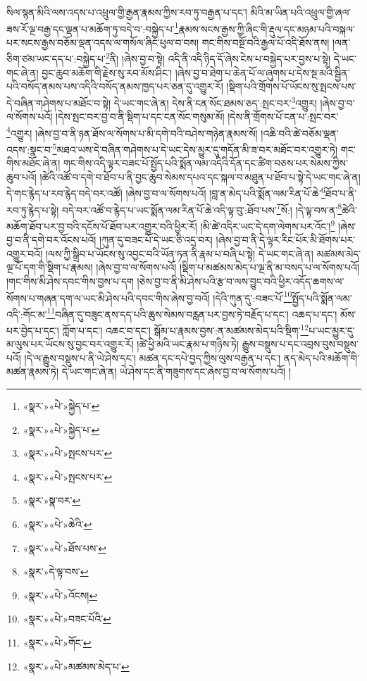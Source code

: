 སིལ་སྙན་མིའི་ལས་འདས་པ་འཕྲུལ་གྱི་རྒྱན་རྣམས་ཀྱིས་རབ་ཏུ་བརྒྱན་པ་དང་། མིའི་མ་ཡིན་པའི་འཕྲུལ་གྱི་ཞལ་ཟས་རོ་ལྔ་བརྒྱ་དང་ལྡན་པ་མཆོག་ཏུ་བདེ་བ་:བསྐྱེད་པ་\footnote{«སྣར་»«པེ་»སྐྱེད་པ་}རྣམས་སངས་རྒྱས་ཀྱི་ཞིང་གི་རྡུལ་དང་མཉམ་པའི་བསྐལ་པར་སངས་རྒྱས་བཅོམ་ལྡན་འདས་ལ་གསོལ་ཞིང་ཕུལ་བ་བས། གང་གིས་བསྔོ་བའི་རྒྱལ་པོ་འདི་ཐོས་ནས། །ལན་ཅིག་ཙམ་ཡང་དད་པ་:བསྐྱེད་པ་\footnote{«སྣར་»«པེ་»སྐྱེད་པ་}ནི། །ཞེས་བྱ་བ་སྟེ། འདི་ནི་འདི་ཉིད་དོ་ཞེས་ངེས་པ་བསྐྱེད་པར་བྱས་པ་སྟེ། དེ་ཡང་གང་ཞེ་ན། བྱང་ཆུབ་མཆོག་གི་རྗེས་སུ་རབ་མོས་ཤིང་། །ཞེས་བྱ་བ་ཐེག་པ་ཆེན་པོ་ལ་ཞུགས་པ་དེས་སྔ་མའི་སྦྱིན་པའི་བསོད་ནམས་པས་འདིའི་བསོད་ནམས་ཁྱད་པར་ཅན་དུ་འགྱུར་རོ། །སྡིག་པའི་གྲོགས་པོ་ཡོངས་སུ་སྤངས་པས་དེ་བཞིན་གཤེགས་པ་མཐོང་བ་སྟེ། དེ་ཡང་གང་ཞེ་ན། དེས་ནི་ངན་སོང་ཐམས་ཅད་:སྤང་བར་\footnote{«སྣར་»«པེ་»སྤངས་པར་}འགྱུར། །ཞེས་བྱ་བ་ལ་སོགས་པའོ། །དེས་སྤང་བར་བྱ་བ་ནི་སྡིག་པ་དང་ངན་སོང་གསུམ་མོ། །དེས་ནི་གྲོགས་པོ་ངན་པ་:སྤང་བར་\footnote{«སྣར་»«པེ་»སྤངས་པར་}འགྱུར། །ཞེས་བྱ་བ་ནི་ཉན་ཐོས་ལ་སོགས་པ་མི་དགེ་བའི་བཤེས་གཉེན་རྣམས་སོ། །འཆི་བའི་ཚེ་བཅོམ་ལྡན་འདས་:སྣང་བ་\footnote{«སྣར་»སྣ་བར་}མཐའ་ཡས་དེ་བཞིན་གཤེགས་པ་དེ་ཡང་དེས་མྱུར་དུ་གདོན་མི་ཟ་བར་མཐོང་བར་འགྱུར་ཏེ། གང་གིས་མཐོང་ཞེ་ན། གང་གིས་འདི་ལྟར་བཟང་པོ་སྤྱོད་པའི་སྨོན་ལམ་འདིའི་དོན་དང་ཚིག་བཅས་པར་སེམས་ཀྱིས་ཆུབ་པའོ། །ཚེའི་འཚོ་བ་དགེ་བ་ཐོབ་པ་ནི་བྱང་ཆུབ་སེམས་དཔའ་དང་སྐལ་བ་མཐུན་པ་ཐོབ་པ་སྟེ་དེ་ཡང་གང་ཞེ་ན། དེ་གང་རྙེད་པ་རབ་རྙེད་བདེ་བར་འཚོ། །ཞེས་བྱ་བ་ལ་སོགས་པའོ། །བླ་ན་མེད་པའི་སྨོན་ལམ་རིན་པོ་ཆེ་\footnote{«སྣར་»«པེ་»ཆེའི་}ཐོབ་པ་ནི་རབ་ཏུ་རྙེད་པ་སྟེ། བདེ་བར་འཚོ་བ་རྙེད་པ་ཡང་སྨོན་ལམ་རིན་པོ་ཆེ་འདི་ལྟ་བུ་:ཐོབ་པས་\footnote{«སྣར་»«པེ་»ཐོས་པས་}སོ:། །དེ་ལྟ་བས་ན་\footnote{«སྣར་»དེ་ལྟ་བས་}ཚེའི་མཆོག་ཐོབ་པར་བྱ་བའི་དངོས་པོ་ཐོབ་པར་འགྱུར་བའི་ཕྱིར་རོ། །མི་ཚེ་འདིར་ཡང་དེ་དག་ལེགས་པར་འོང་།\footnote{«སྣར་»«པེ་»འོངས།} །ཞེས་བྱ་བ་ནི་དགེ་བར་འོངས་པའོ། །ཀུན་དུ་བཟང་པོ་དེ་ཡང་ཅི་འདྲ་བར། །ཞེས་བྱ་བ་ནི་དེ་ལྟར་རིང་པོར་མི་ཐོགས་པར་འགྱུར་བའོ། །ལས་ཀྱི་སྒྲིབ་པ་ཡོངས་སུ་འབྱང་བའི་ཡོན་ཏན་ནི་རྣམ་པ་བཞི་པ་སྟེ། དེ་ཡང་གང་ཞེ་ན། མཚམས་མེད་ལྔ་པོ་དག་གི་སྡིག་པ་རྣམས། །ཞེས་བྱ་བ་ལ་སོགས་པའོ། །སྡིག་པ་མཚམས་མེད་པ་ལྔ་ནི་མ་བསད་པ་ལ་སོགས་པའོ། །གང་གིས་མི་ཤེས་དབང་གིས་བྱས་པ་དག །ཅེས་བྱ་བ་ནི་མི་ཤེས་པའི་རྩ་བ་ལས་བྱུང་བའི་ཕྱིར་འདོད་ཆགས་ལ་སོགས་པ་གཞན་དག་ལ་ཡང་མི་ཤེས་པའི་དབང་གིས་ཞེས་བྱ་བའོ། །དེའི་ཀུན་དུ་:བཟང་པོ་\footnote{«སྣར་»«པེ་»བཟང་པོའི་}སྤྱོད་པའི་སྨོན་ལམ་འདི་:གོང་མ་\footnote{«སྣར་»«པེ་»གོང་}བཞིན་དུ་བཟུང་ནས་དད་པའི་ཆུས་སེམས་བརླན་པར་བྱས་ཏེ་བརྗོད་པ་དང་། འཆད་པ་དང་། མོས་པར་བྱེད་པ་དང་། ཀློག་པ་དང་། འཆང་བ་དང་། སྒོམ་པ་རྣམས་བྱས་:ན་མཚམས་མེད་པའི་སྡིག་\footnote{«སྣར་»«པེ་»མཚམས་མེད་པ་}པ་ཡང་མྱུར་དུ་མ་ལུས་པར་ཡོངས་སུ་བྱང་བར་འགྱུར་རོ། །ཚེ་ཕྱི་མའི་ཡང་རྣམ་པ་གཉིས་ཏེ། རྒྱུས་བསྡུས་པ་དང་འབྲས་བུས་བསྡུས་པའོ། །དེ་ལ་རྒྱུས་བསྡུས་པ་ནི་ཡེ་ཤེས་དང་། མཚན་དང་དཔེ་བྱད་ཀྱིས་ལུས་བརྒྱན་པ་དང་། ནད་མེད་པའི་མཆོག་གི་མཚན་རྣམས་ཏེ། དེ་ཡང་གང་ཞེ་ན། ཡེ་ཤེས་དང་ནི་གཟུགས་དང་ཞེས་བྱ་བ་ལ་སོགས་པའོ། །
